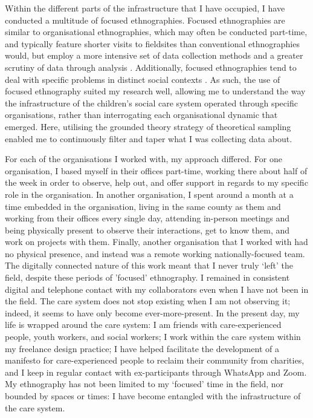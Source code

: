 Within the different parts of the infrastructure that I have occupied, I have conducted a multitude of focused ethnographies. Focused ethnographies are similar to organisational ethnographies, which may often be conducted part-time, and typically feature shorter visits to fieldsites than conventional ethnographies would, but employ a more intensive set of data collection methods and a greater scrutiny of data through analysis \cite{knoblauch_focused_2005}. Additionally, focused ethnographies tend to deal with specific problems in distinct social contexts \cite{wall_focused_2014}. As such, the use of focused ethnography suited my research well, allowing me to understand the way the infrastructure of the children's social care system operated through specific organisations, rather than interrogating each organisational dynamic that emerged. Here, utilising the grounded theory strategy of theoretical sampling \cite{charmaz_constructing_2006, 96} enabled me to continuously filter and taper what I was collecting data about. 

For each of the organisations I worked with, my approach differed. For one organisation, I based myself in their offices part-time, working there about half of the week in order to observe, help out, and offer support in regards to my specific role in the organisation. In another organisation, I spent around a month at a time embedded in the organisation, living in the same county as them and working from their offices every single day, attending in-person meetings and being physically present to observe their interactions, get to know them, and work on projects with them. Finally, another organisation that I worked with had no physical presence, and instead was a remote working nationally-focused team. The digitally connected nature of this work meant that I never truly ‘left’ the field, despite these periods of 'focused' ethnography. I remained in consistent digital and telephone contact with my collaborators even when I have not been in the field. The care system does not stop existing when I am not observing it; indeed, it seems to have only become ever-more-present. In the present day, my life is wrapped around the care system: I am friends with care-experienced people, youth workers, and social workers; I work within the care system within my freelance design practice; I have helped facilitate the development of a manifesto for care-experienced people to reclaim their community from charities, and I keep in regular contact with ex-participants through WhatsApp and Zoom. My ethnography has not been limited to my ‘focused’ time in the field, nor bounded by spaces or times: I have become entangled with the infrastructure of the care system.

